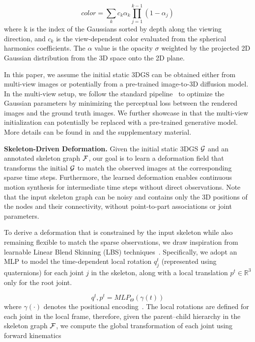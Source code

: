 \begin{equation}
color = \sum_k c_k \alpha_k \prod_{j=1}^{k-1} (1 - \alpha_j)
\end{equation}
where k is the index of the Gaussians sorted by depth along the viewing direction, and $c_k$ is the view-dependent color evaluated from the spherical harmonics coefficients.
The $\alpha$ value is the opacity $\sigma$ weighted by the projected 2D Gaussian distribution from the 3D space onto the 2D plane. 

In this paper, we assume the initial static 3DGS can be obtained  either from multi-view images or potentially from a pre-trained image-to-3D diffusion model. In the multi-view setup, we follow the standard pipeline~\cite{kerbl3Dgaussians} to optimize the Gaussian parameters by minimizing the perceptual loss between the rendered images and the ground truth images. %
We further showcase in  that the multi-view initialization can potentially be replaced with a pre-trained generative model. More details can be found in  and the supplementary material.


\par 
\vspace{6pt}
\noindent\textbf{Skeleton-Driven Deformation.}
Given the initial static 3DGS $\mathcal{G}$ and an annotated skeleton graph $\mathcal{F}$, our goal is to learn a deformation field that transforms the initial $\mathcal{G}$ to match the observed images at the corresponding sparse time steps. Furthermore, the learned deformation enables continuous motion synthesis for intermediate time steps without direct observations.
Note that the input skeleton graph can be noisy and contains only the 3D positions of the nodes and their connectivity, without point-to-part associations or joint parameters.

To derive a deformation that is constrained by the input skeleton  while also remaining flexible to match the sparse observations, we draw inspiration from learnable Linear Blend Skinning (LBS) techniques~\cite{magnenat1989joint,yang2022banmo,yao2025riggs,li2025articulated}. 
Specifically, we adopt an MLP to model the time-dependent local rotation $q^t_j $ (represented using quaternions) for each joint $j$ in the skeleton, along with a local translation $p^t \in \mathbb{R}^3$ only for the root joint. 

\begin{equation}
q^t, p^t = MLP_{\Theta}(\gamma(t))
\end{equation}
where $\gamma(\cdot)$ denotes the positional encoding~\cite{mildenhall2021nerf}. 
The local rotations are defined for each joint in the local frame, therefore, given the parent–child hierarchy in the skeleton graph $\mathcal{F}$, we compute the global transformation of each joint using forward kinematics~\cite{denavit1955kinematic}

